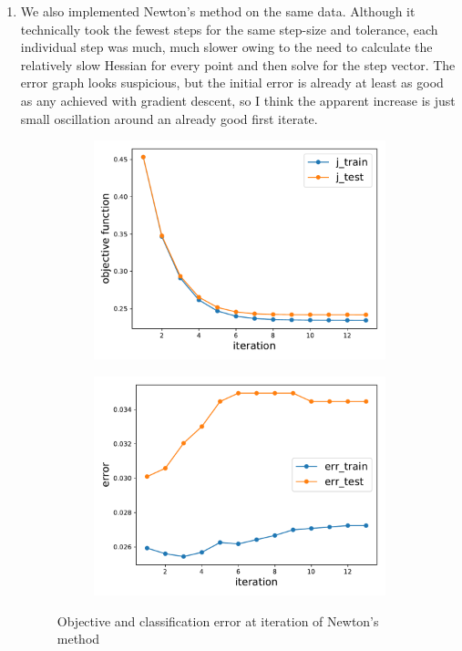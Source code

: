 \documentclass[11pt,letterpaper]{article}
\numberwithin{equation}{section}
\numberwithin{figure}{section}
\begin{document}
\begin{enumerate}
\begin{enumerate}
		\item We also implemented Newton's method on the same data. Although it technically took the fewest steps for the same step-size and tolerance, each individual step was much, much slower owing to the need to calculate the relatively slow Hessian for every point and then solve for the step vector. The error graph looks suspicious, but the initial error is already at least as good as any achieved with gradient descent, so I think the apparent increase is just small oscillation around an already good first iterate.


		\begin{figure}[H]
			\centering
			\begin{subfigure}{.45\textwidth}
				\centering
				\includegraphics[width=\textwidth]{figures/mnist_newt_obj.pdf}
			\end{subfigure}
			\begin{subfigure}{.45\textwidth}
				\centering
				\includegraphics[width=\textwidth]{figures/mnist_newt_err.pdf}
			\end{subfigure}
			\caption{Objective and classification error at iteration of Newton's method}
		\end{figure}
	\end{enumerate}
\end{enumerate}
\end{document}
